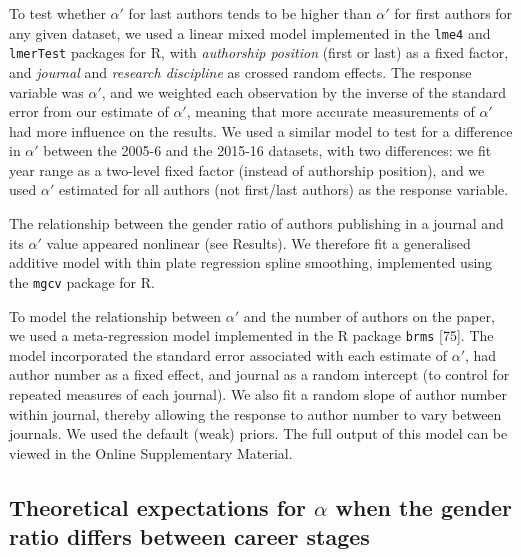 \documentclass[12pt,]{article}
\begin{document}
To test whether \(\alpha'\) for last authors tends to be higher than
\(\alpha'\) for first authors for any given dataset, we used a linear
mixed model implemented in the \texttt{lme4} and \texttt{lmerTest}
packages for R, with \emph{authorship position} (first or last) as a
fixed factor, and \emph{journal} and \emph{research discipline} as
crossed random effects. The response variable was \(\alpha'\), and we
weighted each observation by the inverse of the standard error from our
estimate of \(\alpha'\), meaning that more accurate measurements of
\(\alpha'\) had more influence on the results. We used a similar model
to test for a difference in \(\alpha'\) between the 2005-6 and the
2015-16 datasets, with two differences: we fit year range as a two-level
fixed factor (instead of authorship position), and we used \(\alpha'\)
estimated for all authors (not first/last authors) as the response
variable.

The relationship between the gender ratio of authors publishing in a
journal and its \(\alpha'\) value appeared nonlinear (see Results). We
therefore fit a generalised additive model with thin plate regression
spline smoothing, implemented using the \texttt{mgcv} package for R.

To model the relationship between \(\alpha'\) and the number of authors
on the paper, we used a meta-regression model implemented in the R
package \texttt{brms} {[}75{]}. The model incorporated the standard
error associated with each estimate of \(\alpha'\), had author number as
a fixed effect, and journal as a random intercept (to control for
repeated measures of each journal). We also fit a random slope of author
number within journal, thereby allowing the response to author number to
vary between journals. We used the default (weak) priors. The full
output of this model can be viewed in the Online Supplementary Material.

\hypertarget{theoretical-expectations-for-alpha-when-the-gender-ratio-differs-between-career-stages-1}{%
\subsection{\texorpdfstring{Theoretical expectations for \(\alpha\) when
the gender ratio differs between career
stages}{Theoretical expectations for \textbackslash{}alpha when the gender ratio differs between career stages}}\label{theoretical-expectations-for-alpha-when-the-gender-ratio-differs-between-career-stages-1}}
\end{document}

